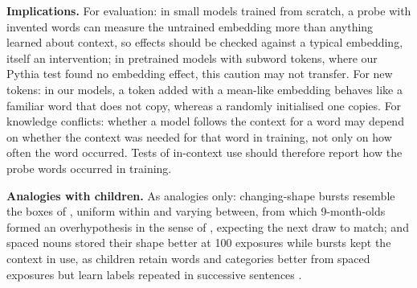 \documentclass[11pt]{article}
\begin{document}
\textbf{Implications.} For evaluation: in small models trained from scratch, a probe with invented words can measure the untrained embedding more than anything learned about context, so effects should be checked against a typical embedding, itself an intervention; in pretrained models with subword tokens, where our Pythia test found no embedding effect, this caution may not transfer. For new tokens: in our models, a token added with a mean-like embedding behaves like a familiar word that does not copy, whereas a randomly initialised one copies. For knowledge conflicts: whether a model follows the context for a word may depend on whether the context was needed for that word in training, not only on how often the word occurred. Tests of in-context use should therefore report how the probe words occurred in training.

\textbf{Analogies with children.} As analogies only: changing-shape bursts resemble the boxes of \citet{dewar2010}, uniform within and varying between, from which 9-month-olds formed an overhypothesis in the sense of \citet{kemp2007}, expecting the next draw to match; and spaced nouns stored their shape better at 100 exposures while bursts kept the context in use, as children retain words and categories better from spaced exposures \citep{childers2002,vlach2008} but learn labels repeated in successive sentences \citep{schwab2016}.
\end{document}
